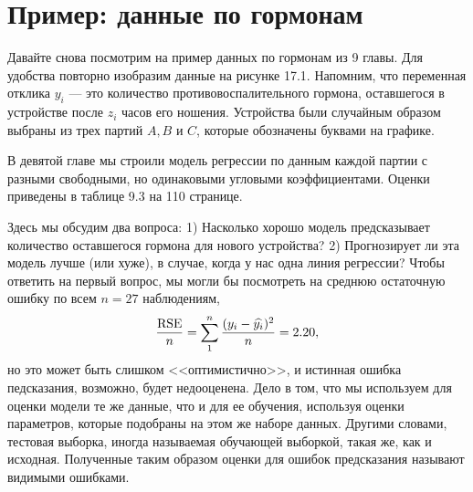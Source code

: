 
\section{Пример: данные по гормонам}
Давайте снова посмотрим на пример данных по гормонам из 9 главы. Для удобства повторно изобразим данные на рисунке 17.1. Напомним, что переменная отклика $y_{i}$ --- это количество противовоспалительного гормона, оставшегося в устройстве после $z_{i}$ часов его ношения. Устройства были случайным образом выбраны из трех партий $A, B$ и $C$, которые обозначены буквами на графике.
\begin{figure}[h]
\end{figure}
В девятой главе мы строили модель регрессии по данным каждой партии с разными свободными, но одинаковыми угловыми коэффициентами. Оценки приведены в таблице 9.3 на 110 странице.

Здесь мы обсудим два вопроса: 1) Насколько хорошо модель предсказывает количество оставшегося гормона для нового устройства? 2) Прогнозирует ли эта модель лучше (или хуже), в случае, когда у нас одна линия регрессии? Чтобы ответить на первый вопрос, мы могли бы посмотреть на среднюю остаточную ошибку по всем $n = 27$ наблюдениям,
\begin{equation}
\frac{\text{RSE}}{n} = \sum_{1}^{n} \frac{(y_{i} - \widehat{y_{i}})^{2}}{n} = 2.20,
\end{equation}
но это может быть слишком <<оптимистично>>, и истинная ошибка педсказания, возможно, будет недооценена. Дело в том, что мы используем для оценки модели те же данные, что и для ее обучения, используя оценки параметров, которые подобраны на этом же наборе данных. Другими словами, тестовая выборка, иногда называемая обучающей выборкой, такая же, как и исходная. Полученные таким образом оценки для ошибок предсказания называют видимыми ошибками.

